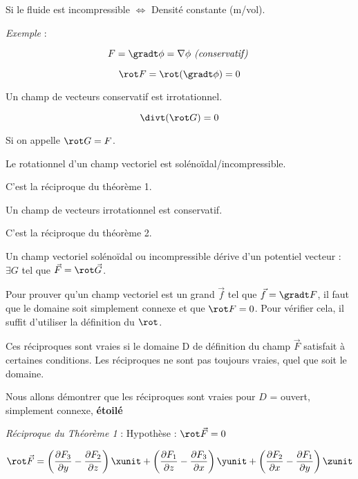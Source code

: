  Si le fluide est incompressible $\Leftrightarrow$ Densité constante (m/vol).
 
 \textit{ Exemple} :

 \[F= \gradt \phi = \nabla \phi \textit{ (conservatif) }\]

 \[\rot F = \rot ( \gradt \phi ) =0\]

 \begin{mytheo}
 Un champ de vecteurs conservatif est irrotationnel.
 \end{mytheo}

 \[\divt ( \rot G ) = 0\]

 Si on appelle $\rot G = F$.

 \begin{mytheo}
 Le rotationnel d'un champ vectoriel est solénoïdal/incompressible.
 \end{mytheo}


 \begin{mytheo}
 C'est la réciproque du théorème 1.


 Un champ de vecteurs irrotationnel est conservatif.
 \end{mytheo}


 \begin{mytheo}
C'est la réciproque du théorème 2.

 Un champ vectoriel solénoïdal ou incompressible dérive d'un potentiel vecteur : $\exists G$ tel que $\vec F = \rot \vec G$.
 \end{mytheo}
 \begin{myrem}

Pour prouver qu'un champ vectoriel est un grand $\vec f $ tel que $\vec f = \gradt F$, il faut que le domaine soit simplement connexe et que $\rot F=0$. Pour vérifier cela, il suffit d'utiliser la définition du $\rot$.

 \end{myrem}
 Ces réciproques sont vraies si le domaine D de définition du champ $\vec F$ satisfait à certaines conditions. Les réciproques ne sont pas toujours vraies, quel que soit le domaine.

 Nous allons démontrer que les réciproques sont vraies pour $D$ = ouvert, simplement connexe, \textbf{étoilé}


 \textit{Réciproque du Théorème 1} : Hypothèse : $\rot \vec F =0$

 \[\rot \vec F
=\left( \frac{\partial F_3}{\partial y } -  \frac{\partial F_2}{\partial z }\right) \xunit
+\left( \frac{\partial F_1}{\partial z } -  \frac{\partial F_3}{\partial x }\right) \yunit
+\left( \frac{\partial F_2}{\partial x } -  \frac{\partial F_1}{\partial y }\right) \zunit
\]

